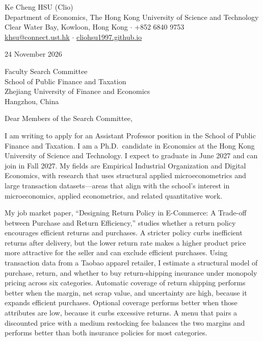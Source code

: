 \documentclass[11pt]{article}
\begin{document}
\begin{flushleft}
Ke Cheng HSU (Clio) \\
Department of Economics, The Hong Kong University of Science and Technology \\
Clear Water Bay, Kowloon, Hong Kong $\cdot$ +852 6840 9753 \\
\href{mailto:khsu@connect.ust.hk}{khsu@connect.ust.hk} $\cdot$ \href{https://cliohsu1997.github.io/}{cliohsu1997.github.io}
\end{flushleft}

24 November 2026

\vspace{0.12em}
Faculty Search Committee \\
School of Public Finance and Taxation \\
Zhejiang University of Finance and Economics \\
Hangzhou, China

\vspace{0.12em}
Dear Members of the Search Committee,

I am writing to apply for an Assistant Professor position in the School of Public Finance and Taxation. I am a Ph.D.\ candidate in Economics at the Hong Kong University of Science and Technology. I expect to graduate in June 2027 and can join in Fall 2027. My fields are Empirical Industrial Organization and Digital Economics, with research that uses structural applied microeconometrics and large transaction datasets---areas that align with the school's interest in microeconomics, applied econometrics, and related quantitative work.

My job market paper, ``Designing Return Policy in E-Commerce: A Trade-off between Purchase and Return Efficiency,'' studies whether a return policy encourages efficient returns and purchases. A stricter policy curbs inefficient returns after delivery, but the lower return rate makes a higher product price more attractive for the seller and can exclude efficient purchases. Using transaction data from a Taobao apparel retailer, I estimate a structural model of purchase, return, and whether to buy return-shipping insurance under monopoly pricing across six categories. Automatic coverage of return shipping performs better when the margin, net scrap value, and uncertainty are high, because it expands efficient purchases. Optional coverage performs better when those attributes are low, because it curbs excessive returns. A menu that pairs a discounted price with a medium restocking fee balances the two margins and performs better than both insurance policies for most categories.
\end{document}
